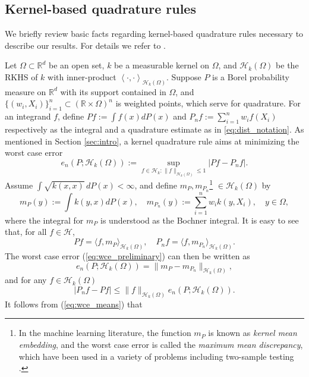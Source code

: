 \documentclass[11pt]{article}
\theoremstyle{remark}
\theoremstyle{example}
\theoremstyle{remark}
\newcommand{\cd}{\cdot}
\renewcommand{\H}{{\mathcal{H}}}
\newcommand{\R}{\mathbb{R}}
\newcommand{\citep}{\cite}
\begin{document}
\subsection{Kernel-based quadrature rules}
\label{sec:wce}

We briefly review basic facts regarding kernel-based quadrature rules necessary to describe our results. 
For details we refer to \cite{BriOatGirOsbSej15,DicKuoSlo13}.

Let $\Omega \subset \R^d$ be an open set, $k$ be a measurable kernel on $\Omega$, and $\H_k(\Omega)$ be the RKHS of $k$ with inner-product $\left< \cd, \cd\right>_{\H_k(\Omega)}$. 
Suppose $P$ is a Borel probability measure on $\R^d$ with its support contained in $\Omega$, and $\{ (w_i, X_i) \}_{i=1}^n \subset (\R \times \Omega)^n$ is weighted points, which serve for quadrature.
For an integrand $f$, define $Pf := \int f(x)dP(x)$ and $P_nf := \sum_{i=1}^n w_i f(X_i)$ respectively as the integral and a quadrature estimate as in \eqref{eq:dist_notation}.
As mentioned in Section \ref{sec:intro}, a kernel quadrature rule aims at minimizing the worst case error  
\begin{equation} \label{eq:wce_preliminary}
e_n(P;\H_k(\Omega)) := \sup_{f \in \H_k: \| f \|_{\H_k(\Omega)} \leq 1} \left| Pf - P_n f \right|.
\end{equation}
Assume $\int \sqrt{k(x,x)}\,dP(x)<\infty$, and define $m_P, m_{P_n}$\footnote{In the machine learning literature, the function $m_P$ is known as {\em kernel mean embedding}, and the worst case error is called the {\em maximum mean discrepancy}, which have been used in a variety of problems including two-sample testing \citep{SriGreFukSchetal10,GreBorRasSchetal12,MuaFukSriSch17}.}  $\in\H_k(\Omega)$ by 
\begin{equation}
m_P(y) := \int k(y,x)dP(x),  \quad m_{P_n}(y) :=  \sum_{i=1}^n w_i k(y,X_i), \quad y\in \Omega \label{eq:kmean},
\end{equation}
where the integral for $m_P$ is understood as the Bochner integral. 
It is easy to see that, for all $f\in\H$,
\[
P f  = \langle f,m_P\rangle_{\H_k(\Omega)}, \quad P_n f  = \langle f,m_{P_n}\rangle_{\H_k(\Omega)}.
\]
The worst case error (\ref{eq:wce_preliminary}) can then be written as 
\begin{equation} \label{eq:wce_means}
e_n(P;\H_k(\Omega)) = \| m_P - m_{P_n} \|_{\H_k(\Omega)},
\end{equation}
and for any $f\in \H_k(\Omega)$ 
\begin{equation}\label{eq:bounded_well_wce}
| P_n f - P f |  \leq   \| f \|_{\H_k(\Omega)} e_n(P;\H_k(\Omega)). 
\end{equation}
%
\label{sec:closed_form_wce}
%
It follows from (\ref{eq:wce_means}) that
\end{document}
